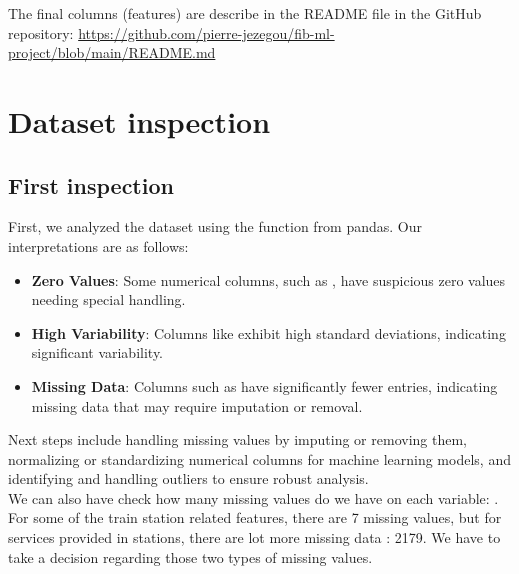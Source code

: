 The final columns (features) are describe in the README file in the GitHub repository: \url{https://github.com/pierre-jezegou/fib-ml-project/blob/main/README.md}

\section{Dataset inspection}
\subsection{First inspection}
First, we analyzed the dataset using the  function from pandas. Our interpretations are as follows:
\begin{itemize}
    \item \textbf{Zero Values}: Some numerical columns, such as , have suspicious zero values needing special handling.
    \item \textbf{High Variability}: Columns like  exhibit high standard deviations, indicating significant variability.
    \item \textbf{Missing Data}: Columns such as  have significantly fewer entries, indicating missing data that may require imputation or removal.
\end{itemize}
Next steps include handling missing values by imputing or removing them, normalizing or standardizing numerical columns for machine learning models, and identifying and handling outliers to ensure robust analysis.\\

We can also have check how many missing values do we have on each variable: . For some of the train station related features, there are 7 missing values, but for services provided in stations, there are lot more missing data : 2179. We have to take a decision regarding those two types of missing values.

